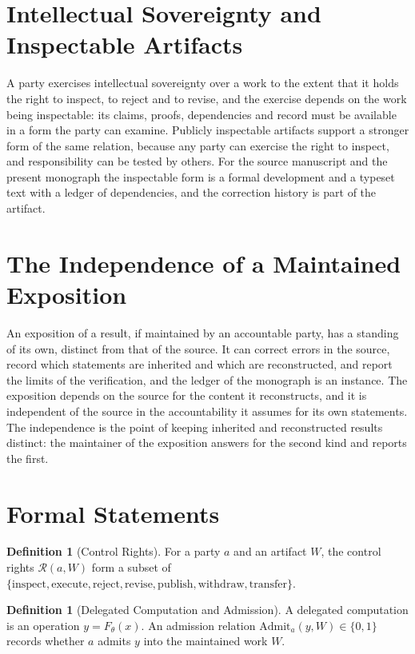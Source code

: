 \documentclass[11pt,letterpaper]{report}
\theoremstyle{plain}
\theoremstyle{definition}
\newtheorem{definition}[theorem]{Definition}
\theoremstyle{remark}
\begin{document}
\section{Intellectual Sovereignty and Inspectable Artifacts}

A party exercises intellectual sovereignty over a work to the extent that it holds the right to inspect, to reject and to revise, and the exercise depends on the work being inspectable: its claims, proofs, dependencies and record must be available in a form the party can examine. Publicly inspectable artifacts support a stronger form of the same relation, because any party can exercise the right to inspect, and responsibility can be tested by others. For the source manuscript and the present monograph the inspectable form is a formal development and a typeset text with a ledger of dependencies, and the correction history is part of the artifact.

\section{The Independence of a Maintained Exposition}

An exposition of a result, if maintained by an accountable party, has a standing of its own, distinct from that of the source. It can correct errors in the source, record which statements are inherited and which are reconstructed, and report the limits of the verification, and the ledger of the monograph is an instance. The exposition depends on the source for the content it reconstructs, and it is independent of the source in the accountability it assumes for its own statements. The independence is the point of keeping inherited and reconstructed results distinct: the maintainer of the exposition answers for the second kind and reports the first.

\section{Formal Statements}

\begin{definition}[Control Rights]\label{def:controlrights}
For a party $a$ and an artifact $W$, the control rights $\mathcal R(a,W)$ form a subset of $\{\mathrm{inspect},\mathrm{execute},\mathrm{reject},\mathrm{revise},\mathrm{publish},\mathrm{withdraw},\mathrm{transfer}\}$.
\end{definition}

\begin{definition}[Delegated Computation and Admission]\label{def:delegation}
A delegated computation is an operation $y=F_\theta(x)$. An admission relation $\mathrm{Admit}_a(y,W)\in\{0,1\}$ records whether $a$ admits $y$ into the maintained work $W$.
\end{definition}
\end{document}
